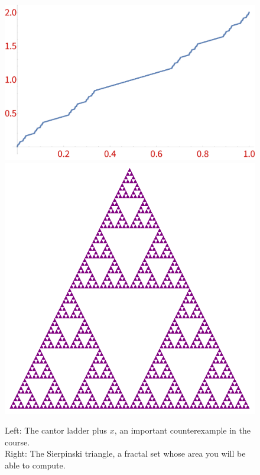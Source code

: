 \documentclass[oneside,11pt]{amsart}
\begin{document}
\begin{figure}[h]
	\includegraphics[height=.35\textwidth]{img/Cantor.pdf}
	\qquad 
	\includegraphics[height=.35\textwidth]{img/Sierp.pdf}
	\caption{Left: The cantor ladder plus $x$, an important counterexample in the course.\\
	Right: The Sierpinski triangle, a fractal set whose area you will be able to compute.}
\end{figure}
%
%
%
%
%
%
\end{document}
